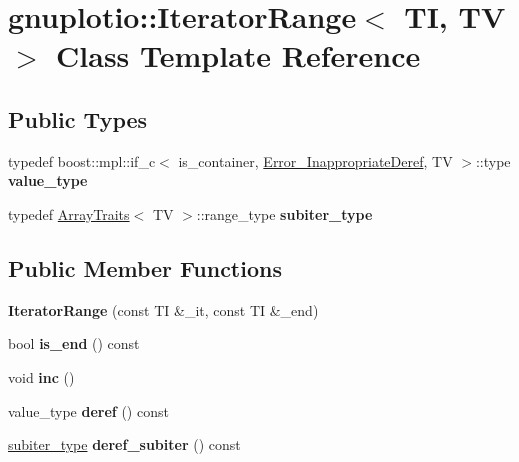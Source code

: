 \hypertarget{classgnuplotio_1_1IteratorRange}{}\section{gnuplotio\+:\+:Iterator\+Range$<$ TI, TV $>$ Class Template Reference}
\label{classgnuplotio_1_1IteratorRange}
\subsection*{Public Types}
\begin{DoxyCompactItemize}
\item 
\mbox{\label{classgnuplotio_1_1IteratorRange_a3d997739282df372a894c586c64a0687}} 
typedef boost\+::mpl\+::if\+\_\+c$<$ is\+\_\+container, \hyperlink{structgnuplotio_1_1Error__InappropriateDeref}{Error\+\_\+\+Inappropriate\+Deref}, TV $>$\+::type {\bfseries value\+\_\+type}
\item 
\mbox{\label{classgnuplotio_1_1IteratorRange_a566ca30462a029f6df4ef16116f99acd}} 
typedef \hyperlink{classgnuplotio_1_1ArrayTraits}{Array\+Traits}$<$ TV $>$\+::range\+\_\+type {\bfseries subiter\+\_\+type}
\end{DoxyCompactItemize}
\subsection*{Public Member Functions}
\begin{DoxyCompactItemize}
\item 
\mbox{\label{classgnuplotio_1_1IteratorRange_adb89135fc292dfc5152120bc7fe6135e}} 
{\bfseries Iterator\+Range} (const TI \&\+\_\+it, const TI \&\+\_\+end)
\item 
\mbox{\label{classgnuplotio_1_1IteratorRange_a966a08441bdd5f5e76e37ef06f507ad7}} 
bool {\bfseries is\+\_\+end} () const
\item 
\mbox{\label{classgnuplotio_1_1IteratorRange_a369f392a561011f8f1c93d13fd976878}} 
void {\bfseries inc} ()
\item 
\mbox{\label{classgnuplotio_1_1IteratorRange_a516ffb8c3716ef5e30f067b595f7dbfb}} 
value\+\_\+type {\bfseries deref} () const
\item 
\mbox{\label{classgnuplotio_1_1IteratorRange_a34ef78d431ad8a643d412851016b2122}} 
\hyperlink{structgnuplotio_1_1Error__WasNotContainer}{subiter\+\_\+type} {\bfseries deref\+\_\+subiter} () const
\end{DoxyCompactItemize}
